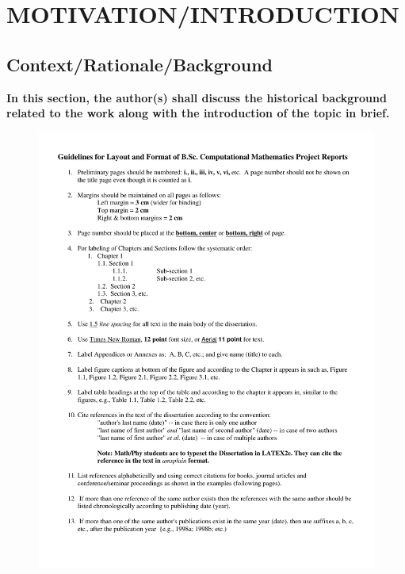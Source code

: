 




\chapter{MOTIVATION/INTRODUCTION}

\section{{\bf{Context/Rationale/Background}}}
{\bf\color{red}In this section, the author(s) shall discuss the  historical background related to the work along with the introduction of the topic in brief.}
\begin{figure}[h]
	\includegraphics[scale=0.5]{figures/layout.pdf}
\end{figure}





